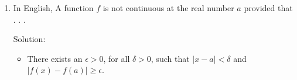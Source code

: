\documentclass[12pt]{article}
\theoremstyle{definition}
\newcommand{\solution}{\textcolor{PineGreen}{Solution:\newline}}
\begin{document}
\begin{enumerate}[leftmargin=*]
\begin{enumerate}[label=(\alph*)]
        \item In English, A function \(f\) is not continuous at the real number \(a\) provided that . . .

        
        \solution
        \begin{itemize}
            \item There exists an \(\epsilon > 0\), for all \(\delta > 0\), such that \(|x - a| < \delta\) and \(|f(x) - f(a)| \geq \epsilon\).

        \end{itemize}
    \end{enumerate}
    
\end{enumerate}

\end{document}
